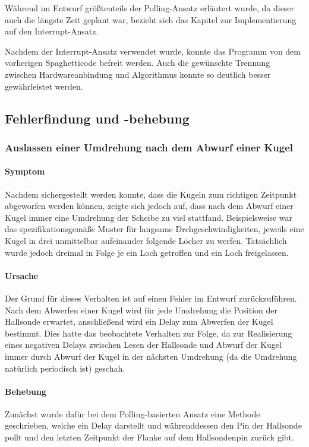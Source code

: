 \documentclass{kis}
\begin{document}
Während im Entwurf größtenteils der Polling-Ansatz erläutert wurde, da dieser auch die längste Zeit geplant war, bezieht sich das Kapitel zur Implementierung auf den Interrupt-Ansatz.

Nachdem der Interrupt-Ansatz verwendet wurde, konnte das Programm von dem vorherigen Spaghetticode befreit werden. Auch die gewünschte Trennung zwischen Hardwareanbindung und Algorithmus konnte so deutlich besser gewährleistet werden.

\subsection{Fehlerfindung und -behebung}

\subsubsection{Auslassen einer Umdrehung nach dem Abwurf einer Kugel}
\paragraph{Symptom}
Nachdem sichergestellt werden konnte, dass die Kugeln zum richtigen Zeitpunkt abgeworfen werden können, zeigte sich jedoch auf, dass nach dem Abwurf einer Kugel immer eine Umdrehung der Scheibe zu viel stattfand. Beispielsweise war das spezifikationsgemäße Muster für langsame Drehgeschwindigkeiten, jeweils eine Kugel in drei unmittelbar aufeinander folgende Löcher zu werfen. Tatsächlich wurde jedoch dreimal in Folge je ein Loch getroffen und ein Loch freigelassen.

\paragraph{Ursache}
Der Grund für dieses Verhalten ist auf einen Fehler im Entwurf zurück\-zu\-führen. Nach dem Abwerfen einer Kugel wird für jede Umdrehung die Position der Hallsonde erwartet, anschließend wird ein Delay zum Abwerfen der Kugel bestimmt. Dies hatte das beobachtete Verhalten zur Folge, da zur Realisierung eines \glqq negativen Delays\grqq{} zwischen Lesen der Hallsonde und Abwurf der Kugel immer durch Abwurf der Kugel in der nächsten Umdrehung (da die Umdrehung natürlich periodisch ist) geschah. 

\paragraph{Behebung}
Zunächst wurde dafür bei dem Polling-basierten Ansatz eine Methode geschrieben, welche ein Delay darstellt und währenddessen den Pin der Hallsonde pollt und den letzten Zeitpunkt der Flanke auf dem Hallsondenpin zurück gibt. 
\end{document}
